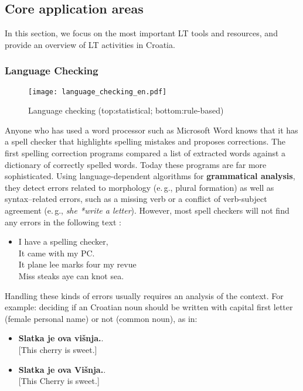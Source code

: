 \begin{multicols}{2}
\subsection{Core application areas}

In this section, we focus on the most important LT tools and resources, and provide an overview of LT activities in Croatia.

\subsubsection{Language Checking}

\begin{figure*}[t]
  \center
  \texttt{[image: language\_checking\_en.pdf]}
  \caption{Language checking (top:statistical; bottom:rule-based)}
  \label{fig:langcheckingaarch_en}
\end{figure*}

Anyone who has used a word processor such as Microsoft Word knows that it has a spell checker that highlights spelling mistakes and proposes corrections. The first spelling correction programs compared a list of extracted words against a dictionary of correctly spelled words. Today these programs are far more sophisticated. Using language-dependent algorithms for \textbf{grammatical analysis}, they detect errors related to morphology (e.\,g., plural formation) as well as syntax--related errors, such as a missing verb or a conflict of verb-subject agreement (e.\,g., \textit{she *write a letter}). However, most spell checkers will not find any errors in the following text \cite{art11}:

\begin{itemize}
\item[] I have a spelling checker,\\
  It came with my PC.\\
  It plane lee marks four my revue\\
  Miss steaks aye can knot sea.
\end{itemize}

Handling these kinds of errors usually requires an analysis of the context. For example: deciding if an Croatian noun should be written with capital first letter (female personal name) or not (common noun), as in:

\begin{itemize}
\item \textbf{Slatka je ova višnja.}.\\
  {[}This cherry is sweet.{]} 
\item \textbf{Slatka je ova Višnja.}.\\
  {[}This Cherry is sweet.{]}
\end{itemize}


\end{multicols}
